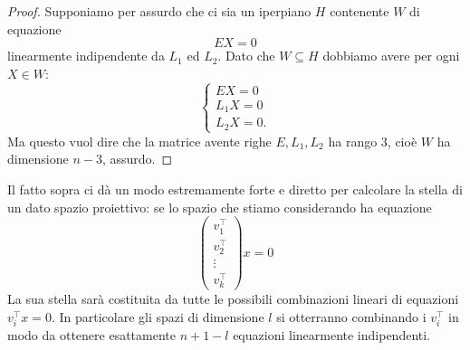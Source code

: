 \documentclass[11pt]{scrartcl}
\begin{document}
   	 \begin{proof}
   	 	Supponiamo per assurdo che ci sia un iperpiano $H$ contenente $W$ di equazione 
   	 	$$EX=0$$
   	 	linearmente indipendente da $L_1$ ed $L_2$. Dato che $W\subseteq H$ dobbiamo avere per ogni $X\in W$:
   	 	$$
   	 	\begin{cases}
   	 		EX=0 \\
   	 		L_1X=0 \\
   	 		L_2X=0.
   	 	\end{cases}
   	 	$$
   	 	Ma questo vuol dire che la matrice avente righe $E,L_1,L_2$ ha rango $3$, cioè $W$ ha dimensione $n-3$, assurdo.
   	 \end{proof}
   	 Il fatto sopra ci dà un modo estremamente forte e diretto per calcolare la stella di un dato spazio proiettivo: se lo spazio che stiamo considerando ha equazione
   	 $$
   	 \left(
   	 \begin{array}{c}
   	 	v_1^\intercal \\
   	 	\hline 
   	 	v_2^\intercal \\
   	 	\hline 
   	 	\vdots \\
   	 	\hline 
   	 	v_k^\intercal
   	 \end{array}
   	 \right)x=0
   	 $$
   	 La sua stella sarà costituita da tutte le possibili combinazioni lineari di equazioni $v_i^\intercal x =0$. In particolare gli spazi di dimensione $l$ si otterranno combinando i $v_i^\intercal$ in modo da ottenere esattamente $n+1-l$ equazioni linearmente indipendenti.
\end{document}
